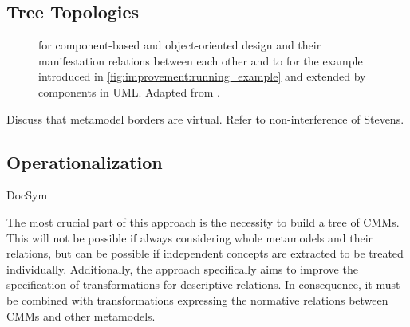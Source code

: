 \subsection{Tree Topologies}

\begin{figure}
    \centering
    
    \caption[Example for tree topology of \commonalities]{\Conceptmetamodels for component-based and object-oriented design and their manifestation relations between each other and to \concretemetamodels for the example introduced in \autoref{fig:improvement:running_example} and extended by components in \gls{UML}. Adapted from .}
    \label{fig:quality:extended_composed_commonalities_example}
\end{figure}

Discuss that metamodel borders are virtual.
Refer to non-interference of Stevens.


\subsection{Operationalization}



\begin{copiedFrom}{DocSym} %

The most crucial part of this approach is the necessity to build a tree of \glspl{CMM}.
This will not be possible if always considering whole metamodels and their relations, but can be possible if independent concepts are extracted to be treated individually.
Additionally, the approach specifically aims to improve the specification of transformations for descriptive relations.
In consequence, it must be combined with transformations expressing the normative relations between \glspl{CMM} and other metamodels.

\end{copiedFrom} %


